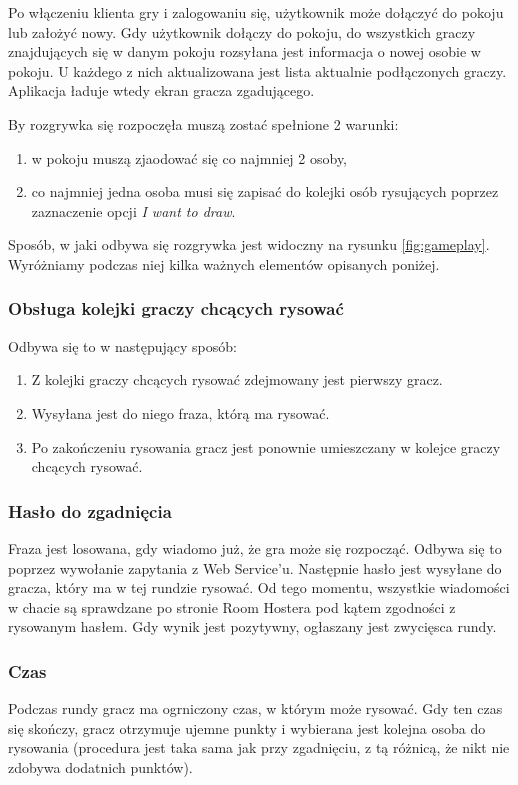 Po włączeniu klienta gry i zalogowaniu się, użytkownik może dołączyć do pokoju lub założyć nowy. Gdy użytkownik dołączy do pokoju, do wszystkich graczy znajdujących się w danym pokoju rozsyłana jest informacja o nowej osobie w pokoju. U każdego z nich aktualizowana jest lista aktualnie podłączonych graczy. Aplikacja ładuje wtedy ekran gracza zgadującego.

By rozgrywka się rozpoczęła muszą zostać spełnione 2 warunki:
\begin{enumerate}
    \item w pokoju muszą zjaodować się co najmniej 2 osoby,
    \item co najmniej jedna osoba musi się zapisać do kolejki osób rysujących poprzez zaznaczenie opcji \textit{I want to draw}.
\end{enumerate}

Sposób, w jaki odbywa się rozgrywka jest widoczny na rysunku \ref{fig:gameplay}. Wyróżniamy podczas niej kilka ważnych elementów opisanych poniżej.

\subsubsection{Obsługa kolejki graczy chcących rysować}
Odbywa się to w następujący sposób:
\begin{enumerate}
    \item Z kolejki graczy chcących rysować zdejmowany jest pierwszy gracz.
    \item Wysyłana jest do niego fraza, którą ma rysować.
    \item Po zakończeniu rysowania gracz jest ponownie umieszczany w kolejce graczy chcących rysować.
\end{enumerate}

\subsubsection{Hasło do zgadnięcia}
Fraza jest losowana, gdy wiadomo już, że gra może się rozpocząć. Odbywa się to poprzez wywołanie zapytania z Web Service'u. Następnie hasło jest wysyłane do gracza, który ma w tej rundzie rysować. Od tego momentu, wszystkie wiadomości w chacie są sprawdzane po stronie Room Hostera pod kątem zgodności z rysowanym hasłem. Gdy wynik jest pozytywny, ogłaszany jest zwycięsca rundy.

\subsubsection{Czas}
Podczas rundy gracz ma ogrniczony czas, w którym może rysować. Gdy ten czas się skończy, gracz otrzymuje ujemne punkty i wybierana jest kolejna osoba do rysowania (procedura jest taka sama jak przy zgadnięciu, z tą różnicą, że nikt nie zdobywa dodatnich punktów).


